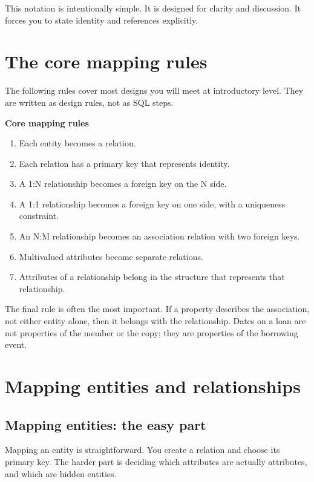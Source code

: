 This notation is intentionally simple.
It is designed for clarity and discussion.
It forces you to state identity and references explicitly.

\section{The core mapping rules}
The following rules cover most designs you will meet at introductory level.
They are written as design rules, not as SQL steps.

\begin{principlebox}
\textbf{Core mapping rules}
\begin{enumerate}[label=\arabic*.]
  \item Each entity becomes a relation.
  \item Each relation has a primary key that represents identity.
  \item A 1:N relationship becomes a foreign key on the N side.
  \item A 1:1 relationship becomes a foreign key on one side, with a uniqueness constraint.
  \item An N:M relationship becomes an association relation with two foreign keys.
  \item Multivalued attributes become separate relations.
  \item Attributes of a relationship belong in the structure that represents that relationship.
\end{enumerate}
\end{principlebox}

The final rule is often the most important.
If a property describes the association, not either entity alone, then it belongs with the relationship.
Dates on a loan are not properties of the member or the copy; they are properties of the borrowing event.

\section{Mapping entities and relationships}

\subsection{Mapping entities: the easy part}
Mapping an entity is straightforward.
You create a relation and choose its primary key.
The harder part is deciding which attributes are actually attributes, and which are hidden entities.

